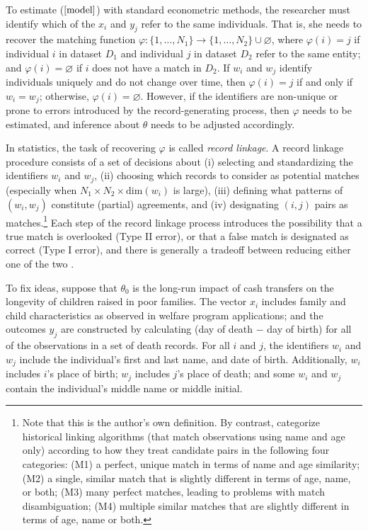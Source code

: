 \documentclass[12pt]{article}
\begin{document}
To estimate ($\ref{model}$) with standard econometric methods, the researcher must identify which of the $x_i$ and $y_j$ refer to the same individuals.   That is, she needs to recover the matching function $\varphi: \{1,\dots, N_1\} \to \{1,\dots, N_2\} \cup \varnothing$, where $\varphi(i) = j$ if individual $i$ in dataset $D_1$ and individual $j$ in dataset $D_2$ refer to the same entity; and $\varphi(i) = \varnothing$ if $i$ does not have a match in $D_2$.  If $w_i$ and $w_j$ identify individuals uniquely and do not change over time, then $\varphi(i) = j$ if and only if $w_i = w_j$; otherwise, $\varphi(i) = \varnothing$.  However, if the identifiers are non-unique or prone to errors introduced by the record-generating process, then $\varphi$ needs to be estimated, and inference about $\theta$ needs to be adjusted accordingly.   

In statistics, the task of recovering $\varphi$ is called \textit{record linkage}.  A record linkage procedure consists of a set of decisions about (i) selecting and standardizing the identifiers $w_i$ and $w_j$, (ii) choosing which records to consider as potential matches (especially when $N_1 \times N_2 \times \text{dim}(w_i) $ is large), (iii) defining what patterns of $(w_i,w_j)$ constitute (partial) agreements, and (iv) designating $(i,j)$ pairs as matches.\footnote{Note that this is the author's own definition.  By contrast, \cite{bailey2017} categorize historical linking algorithms (that match observations using name and age only) according to how they treat candidate pairs in the following four categories: (M1) a perfect, unique match in terms of name and age similarity; (M2) a single, similar match that is slightly different in terms of age, name, or both; (M3) many perfect matches, leading to problems with match disambiguation; (M4) multiple similar matches that are slightly different in terms of age, name or both.} Each step of the record linkage process introduces the possibility that a true match is overlooked (Type II error), or that a false match is designated as correct (Type I error), and there is generally a tradeoff between reducing either one of the two \citep{abe2019, harron2018}.

To fix ideas, suppose that $\theta_0$ is the long-run impact of cash transfers on the longevity of children raised in poor families.  The vector $x_i$ includes family and child characteristics as observed in welfare program applications; and the outcomes $y_j$ are constructed by calculating (day of death $-$ day of birth) for all of the observations in a set of death records.  For all $i$ and $j$, the identifiers $w_i$ and $w_j$ include the individual's first and last name, and date of birth.  Additionally, $w_i$ includes $i$'s place of birth; $w_j$ includes $j$'s place of death; and some $w_i$ and $w_j$ contain the individual's middle name or middle initial. 
\end{document}
